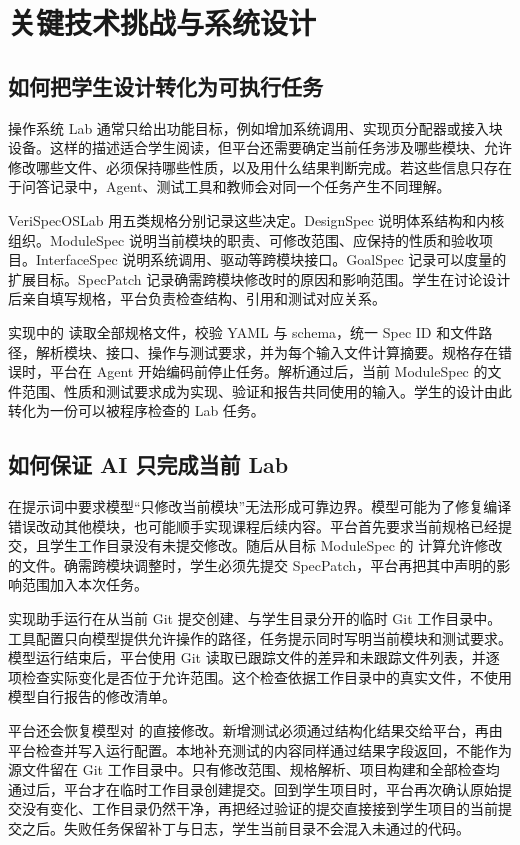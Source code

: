 \chapter{关键技术挑战与系统设计}

\section{如何把学生设计转化为可执行任务}

操作系统 Lab 通常只给出功能目标，例如增加系统调用、实现页分配器或接入块设备。这样的描述适合学生阅读，但平台还需要确定当前任务涉及哪些模块、允许修改哪些文件、必须保持哪些性质，以及用什么结果判断完成。若这些信息只存在于问答记录中，Agent、测试工具和教师会对同一个任务产生不同理解。

VeriSpecOSLab 用五类规格分别记录这些决定。DesignSpec 说明体系结构和内核组织。ModuleSpec 说明当前模块的职责、可修改范围、应保持的性质和验收项目。InterfaceSpec 说明系统调用、驱动等跨模块接口。GoalSpec 记录可以度量的扩展目标。SpecPatch 记录确需跨模块修改时的原因和影响范围。学生在讨论设计后亲自填写规格，平台负责检查结构、引用和测试对应关系。

实现中的  读取全部规格文件，校验 YAML 与 schema，统一 Spec ID 和文件路径，解析模块、接口、操作与测试要求，并为每个输入文件计算摘要。规格存在错误时，平台在 Agent 开始编码前停止任务。解析通过后，当前 ModuleSpec 的文件范围、性质和测试要求成为实现、验证和报告共同使用的输入。学生的设计由此转化为一份可以被程序检查的 Lab 任务。

\section{如何保证 AI 只完成当前 Lab}

在提示词中要求模型``只修改当前模块''无法形成可靠边界。模型可能为了修复编译错误改动其他模块，也可能顺手实现课程后续内容。平台首先要求当前规格已经提交，且学生工作目录没有未提交修改。随后从目标 ModuleSpec 的  计算允许修改的文件。确需跨模块调整时，学生必须先提交 SpecPatch，平台再把其中声明的影响范围加入本次任务。

实现助手运行在从当前 Git 提交创建、与学生目录分开的临时 Git 工作目录中。工具配置只向模型提供允许操作的路径，任务提示同时写明当前模块和测试要求。模型运行结束后，平台使用 Git 读取已跟踪文件的差异和未跟踪文件列表，并逐项检查实际变化是否位于允许范围。这个检查依据工作目录中的真实文件，不使用模型自行报告的修改清单。

平台还会恢复模型对  的直接修改。新增测试必须通过结构化结果交给平台，再由平台检查并写入运行配置。本地补充测试的内容同样通过结果字段返回，不能作为源文件留在 Git 工作目录中。只有修改范围、规格解析、项目构建和全部检查均通过后，平台才在临时工作目录创建提交。回到学生项目时，平台再次确认原始提交没有变化、工作目录仍然干净，再把经过验证的提交直接接到学生项目的当前提交之后。失败任务保留补丁与日志，学生当前目录不会混入未通过的代码。

